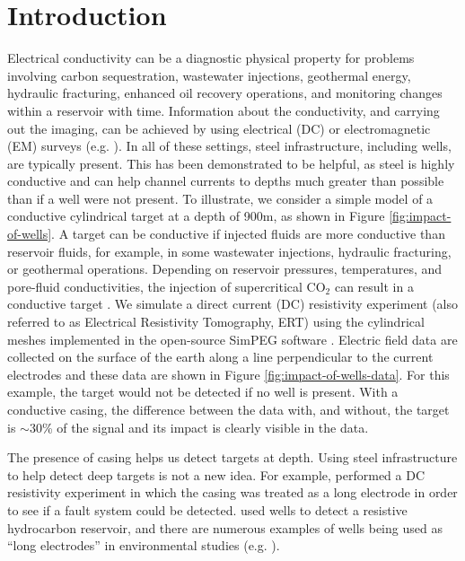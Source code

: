 \documentclass[
    paper
]{geophysics}
\begin{document}
\section{Introduction}
Electrical conductivity can be a diagnostic physical property for problems involving
carbon sequestration, wastewater injections, geothermal energy, hydraulic fracturing, enhanced oil recovery operations, and monitoring changes within a reservoir with time. Information about the conductivity, and carrying out the imaging, can be achieved by using electrical (DC) or electromagnetic (EM) surveys (e.g. \cite{Hoversten2015, Um2015, Puzyrev2017}). In all of these settings, steel infrastructure, including wells, are typically present. This has been demonstrated to be helpful, as steel is highly conductive and can help channel currents to depths much greater than possible than if a well were not present. To illustrate, we consider a simple model of a conductive cylindrical target at a depth of 900m, as shown in Figure \ref{fig:impact-of-wells}. A target can be conductive if injected fluids are more conductive than reservoir fluids, for example, in some wastewater injections, hydraulic fracturing, or geothermal operations. Depending on reservoir pressures, temperatures, and pore-fluid conductivities, the injection of supercritical CO$_2$ can result in a conductive target \citep{Borner2015}. We simulate a direct current (DC) resistivity experiment (also referred to as Electrical Resistivity Tomography, ERT) using the cylindrical meshes implemented in the open-source SimPEG software \citep{Heagy2019a, Cockett2015}. Electric field data are collected on the surface of the earth along a line perpendicular to the current electrodes and these data are shown in Figure \ref{fig:impact-of-wells-data}. For this example, the target would not be detected if no well is present. With a conductive casing, the difference between the data with, and without, the target is $\sim30$\% of the signal and its impact is clearly visible in the data.








The presence of casing helps us detect targets at depth. Using steel infrastructure to help detect deep targets is not a new idea. For example, \cite{Sill1978} performed a DC resistivity experiment in which the casing was treated as a long electrode in order to see if a fault system could be detected. \cite{Rocroi1985} used wells to detect a resistive hydrocarbon reservoir, and there are numerous examples of wells being used as ``long electrodes'' in environmental studies (e.g. \cite{Ramirez1996, Rucker2010}).
\end{document}
